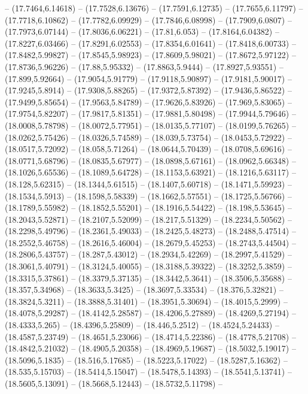 {-- (17.7464,6.14618) -- (17.7528,6.13676) -- (17.7591,6.12735) -- (17.7655,6.11797) -- (17.7718,6.10862) -- (17.7782,6.09929) -- (17.7846,6.08998) -- (17.7909,6.0807) -- (17.7973,6.07144) -- (17.8036,6.06221) -- (17.81,6.053) -- (17.8164,6.04382) --
(17.8227,6.03466) -- (17.8291,6.02553) -- (17.8354,6.01641) -- (17.8418,6.00733) -- (17.8482,5.99827) -- (17.8545,5.98923) -- (17.8609,5.98021) -- (17.8672,5.97122) -- (17.8736,5.96226) -- (17.88,5.95332) -- (17.8863,5.9444) -- (17.8927,5.93551) --
(17.899,5.92664) -- (17.9054,5.91779) -- (17.9118,5.90897) -- (17.9181,5.90017) -- (17.9245,5.8914) -- (17.9308,5.88265) -- (17.9372,5.87392) -- (17.9436,5.86522) -- (17.9499,5.85654) -- (17.9563,5.84789) -- (17.9626,5.83926) -- (17.969,5.83065) --
(17.9754,5.82207) -- (17.9817,5.81351) -- (17.9881,5.80498) -- (17.9944,5.79646) -- (18.0008,5.78798) -- (18.0072,5.77951) -- (18.0135,5.77107) -- (18.0199,5.76265) -- (18.0262,5.75426) -- (18.0326,5.74589) -- (18.039,5.73754) -- (18.0453,5.72922)
-- (18.0517,5.72092) -- (18.058,5.71264) -- (18.0644,5.70439) -- (18.0708,5.69616) -- (18.0771,5.68796) -- (18.0835,5.67977) -- (18.0898,5.67161) -- (18.0962,5.66348) -- (18.1026,5.65536) -- (18.1089,5.64728) -- (18.1153,5.63921) --
(18.1216,5.63117) -- (18.128,5.62315) -- (18.1344,5.61515) -- (18.1407,5.60718) -- (18.1471,5.59923) -- (18.1534,5.5913) -- (18.1598,5.58339) -- (18.1662,5.57551) -- (18.1725,5.56766) -- (18.1789,5.55982) -- (18.1852,5.55201) -- (18.1916,5.54422) --
(18.198,5.53645) -- (18.2043,5.52871) -- (18.2107,5.52099) -- (18.217,5.51329) -- (18.2234,5.50562) -- (18.2298,5.49796) -- (18.2361,5.49033) -- (18.2425,5.48273) -- (18.2488,5.47514) -- (18.2552,5.46758) -- (18.2616,5.46004) -- (18.2679,5.45253) --
(18.2743,5.44504) -- (18.2806,5.43757) -- (18.287,5.43012) -- (18.2934,5.42269) -- (18.2997,5.41529) -- (18.3061,5.40791) -- (18.3124,5.40055) -- (18.3188,5.39322) -- (18.3252,5.3859) -- (18.3315,5.37861) -- (18.3379,5.37135) -- (18.3442,5.3641) --
(18.3506,5.35688) -- (18.357,5.34968) -- (18.3633,5.3425) -- (18.3697,5.33534) -- (18.376,5.32821) -- (18.3824,5.3211) -- (18.3888,5.31401) -- (18.3951,5.30694) -- (18.4015,5.2999) -- (18.4078,5.29287) -- (18.4142,5.28587) -- (18.4206,5.27889) --
(18.4269,5.27194) -- (18.4333,5.265) -- (18.4396,5.25809) -- (18.446,5.2512) -- (18.4524,5.24433) -- (18.4587,5.23749) -- (18.4651,5.23066) -- (18.4714,5.22386) -- (18.4778,5.21708) -- (18.4842,5.21032) -- (18.4905,5.20358) -- (18.4969,5.19687) --
(18.5032,5.19017) -- (18.5096,5.1835) -- (18.516,5.17685) -- (18.5223,5.17022) -- (18.5287,5.16362) -- (18.535,5.15703) -- (18.5414,5.15047) -- (18.5478,5.14393) -- (18.5541,5.13741) -- (18.5605,5.13091) -- (18.5668,5.12443) -- (18.5732,5.11798) --
}

